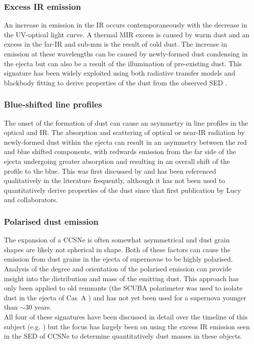 \subsubsection{Excess IR emission}
An increase in emission in the IR occurs contemporaneously with the decrease in the UV-optical light curve.  A thermal MIR excess is caused by warm dust and an excess in the far-IR and sub-mm is the result of cold dust.  The increase in emission at these wavelengths can be caused by newly-formed dust condensing in the ejecta but can also be a result of the illumination of pre-existing dust.  This signature has been widely exploited using both radiative transfer models and blackbody fitting to derive properties of the dust from the observed SED \citep{Wooden1993}.

\subsubsection{Blue-shifted line profiles}
The onset of the formation of dust can cause an asymmetry in line profiles in the optical and IR.  The absorption and scattering of optical or near-IR radiation by newly-formed dust within the ejecta can result in an asymmetry between the red and blue shifted components, with redwards 
emission from the far side of the ejecta undergoing greater absorption and resulting in an overall shift of the profile to the blue.  This was first discussed by \citet{Lucy1989} and has been referenced qualitatively in the literature frequently, although it has not been used to quantitatively derive properties of the dust since that first publication by Lucy and collaborators.

\subsubsection{Polarised dust emission}
The expansion of a CCSNe is often somewhat asymmetrical and dust grain shapes are likely not spherical in shape.  Both of these factors can cause the emission from dust grains in the ejecta of supernovae to be highly polarised.  Analysis of the degree and orientation of the polarised emission can provide insight into the distribution and mass of the emitting dust.  This approach has only been applied to old remnants (the SCUBA polarimeter was used to isolate dust in the ejecta of Cas~A \citep{Dunne2009}) and has not yet been used for a supernova younger than $\sim$30 years.
\\

\noindent All four of these signatures have been discussed in detail over the timeline of this subject (e.g. \citet{Gomez2013}) but the focus has largely been on using the excess IR emission seen in the SED of CCSNe to determine quantitatively dust masses in these objects.  
 

